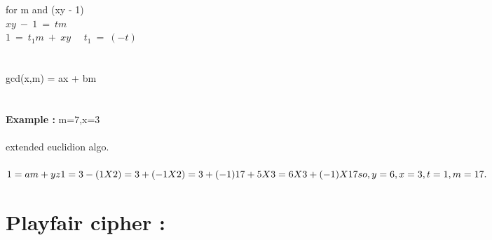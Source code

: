 \documentclass[11pt]{article}
\begin{document}
for m and (xy - 1)\\
$xy\ -\ 1\ =\ tm$ \\
$1\ =\ t_1m\ +\ xy$ \ \ $t_1\ =\ (-t)$
\\\\\\
gcd(x,m) = ax + bm \\
\\\\
\textbf{Example : } m=7,x=3 \\\\
extended euclidion algo.\\\\
$ 1 = am+yz \\
1=3-(1X2)\\
=3+(-1X2)\\
=3+(-1)17+5X3\\
=6X3+(-1)X17\\\\
so, y=6,x=3,t=1,m=17.
$


\newpage


\section{Playfair cipher :}
\end{document}
